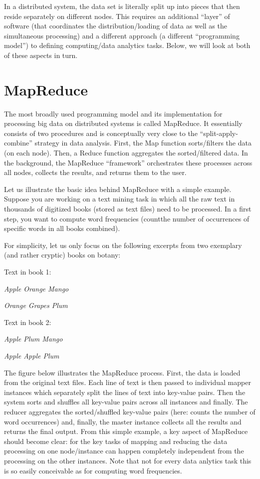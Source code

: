 \documentclass[
  12pt,
]{style/krantz}
\begin{document}
In a distributed system, the data set is literally split up into pieces that then reside separately on different nodes. This requires an additional ``layer'' of software (that coordinates the distribution/loading of data as well as the simultaneous processing) and a different approach (a different ``programming model'') to defining computing/data analytics tasks. Below, we will look at both of these aspects in turn.

\hypertarget{mapreduce}{%
\section{MapReduce}\label{mapreduce}}

The most broadly used programming model and its implementation for processing big data on distributed systems is called MapReduce. It essentially consists of two procedures and is conceptually very close to the ``split-apply-combine'' strategy in data analysis. First, the Map function sorts/filters the data (on each node). Then, a Reduce function aggregates the sorted/filtered data. In the background, the MapReduce ``framework'' orchestrates these processes across all nodes, collects the results, and returns them to the user.

Let us illustrate the basic idea behind MapReduce with a simple example. Suppose you are working on a text mining task in which all the raw text in thousands of digitized books (stored as text files) need to be processed. In a first step, you want to compute word frequencies (countthe number of occurrences of specific words in all books combined).

For simplicity, let us only focus on the following excerpts from two exemplary (and rather cryptic) books on botany:

Text in book 1:

\emph{Apple Orange Mango}
~

\emph{Orange Grapes Plum}
~

Text in book 2:

\emph{Apple Plum Mango}
~

\emph{Apple Apple Plum}
~

The figure below illustrates the MapReduce process. First, the data is loaded from the original text files. Each line of text is then passed to individual mapper instances which separately split the lines of text into key-value pairs. Then the system sorts and shuffles all key-value pairs across all instances and finally. The reducer aggregates the sorted/shuffled key-value pairs (here: counts the number of word occurrences) and, finally, the master instance collects all the results and returns the final output. From this simple example, a key aspect of MapReduce should become clear: for the key tasks of mapping and reducing the data processing on one node/instance can happen completely independent from the processing on the other instances. Note that not for every data anlytics task this is so easily conceivable as for computing word frequencies.
\end{document}
